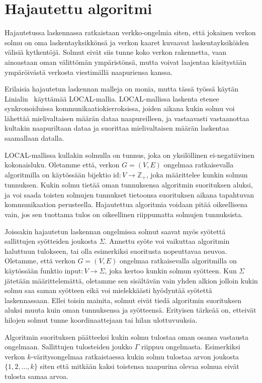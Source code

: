 \documentclass[12pt,finnish]{tktltiki2}
\theoremstyle{definition}
\theoremstyle{remark}
\begin{document}
\section{Hajautettu algoritmi}

Hajautetussa laskennassa ratkaistaan verkko-ongelmia siten, että jokainen verkon solmu on oma laskentayksikkönsä ja verkon kaaret kuvaavat laskentayksiköiden välisiä kytkentöjä. Solmut eivät siis tunne koko verkon rakennetta, vaan ainoastaan oman välittömän ympäristönsä, mutta voivat laajentaa käsitystään ympäröivästä verkosta viestimällä naapuriensa kanssa.

Erilaisia hajautetun laskennan malleja on monia, mutta tässä työssä käytän Linialin~\cite{linial92} käyttämää LOCAL-mallia. LOCAL-mallissa laskenta etenee synkronoiduissa kommunikaatiokierroksissa, joiden aikana kukin solmu voi lähettää mielivaltaisen määrän dataa naapureilleen, ja vastaavasti vastaanottaa kultakin naapuriltaan dataa ja suorittaa mielivaltaisen määrän laskentaa saamallaan datalla.

LOCAL-mallissa kullakin solmulla on tunnus, joka on yksilöllinen ei-negatiivinen kokonaisluku. Oletamme että, verkon $G = (V, E)$ ongelmaa ratkaisevalla algoritmilla on käytössään bijektio $\text{id}: V \rightarrow \mathbb{Z}_+$, joka määrittelee kunkin solmun tunnuksen. Kukin solmu tietää oman tunnuksensa algoritmin suorituksen aluksi, ja voi saada toisten solmujen tunnukset tietoonsa suorituksen aikana tapahtuvan kommunikaation perusteella. Hajautettua algoritmia voidaan pitää oikeellisena vain, jos sen tuottama tulos on oikeellinen riippumatta solmujen tunnuksista.

Joissakin hajautetun laskennan ongelmissa solmut saavat myös syötettä sallittujen syötteiden joukosta $\Sigma$. Annettu syöte voi vaikuttaa algoritmin haluttuun tulokseen, tai olla esimerkiksi suoritusta nopeuttavaa neuvoa. Oletamme, että verkon $G = (V, E)$ ongelmaa ratkaisevalla algoritmilla on käytössään funktio $\text{input}: V \rightarrow \Sigma$, joka kertoo kunkin solmun syötteen. Kun $\Sigma$ jätetään määrittelemättä, oletamme sen sisältävän vain yhden alkion jolloin kukin solmu saa saman syötteen eikä voi mielekkäästi hyödyntää syötettä laskennassaan. Ellei toisin mainita, solmut eivät tiedä algoritmin suorituksen aluksi muuta kuin oman tunnuksensa ja syötteensä. Erityisen tärkeää on, etteivät hilojen solmut tunne koordinaattejaan tai hilan ulottuvuuksia.

Algoritmin suorituksen päätteeksi kukin solmu tulostaa oman osansa vastausta ongelmaan. Sallittujen tulosteiden joukko $\Gamma$ riippuu ongelmasta. Esimerkiksi verkon $k$-väritysongelmaa ratkaistaessa kukin solmu tulostaa arvon joukosta $\{1, 2, \ldots, k\}$ siten että mitkään kaksi toistensa naapurina olevaa solmua eivät tulosta samaa arvoa.
\end{document}
